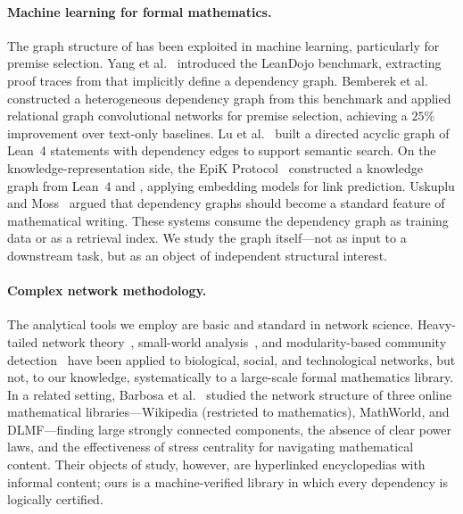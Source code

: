 \paragraph{Machine learning for formal mathematics.}
The graph structure of  has been exploited in machine learning, particularly for premise selection. Yang et al.~\cite{leandojo} introduced the LeanDojo benchmark, extracting proof traces from  that implicitly define a dependency graph. Bemberek et al.~\cite{bemberek2025} constructed a heterogeneous dependency graph from this benchmark and applied relational graph convolutional networks for premise selection, achieving a $25\%$ improvement over text-only baselines. Lu et al.~\cite{leanfinder} built a directed acyclic graph of Lean~4 statements with dependency edges to support semantic search. On the knowledge-representation side, the EpiK Protocol~\cite{epik2024} constructed a knowledge graph from Lean~4 and , applying embedding models for link prediction. Uskuplu and Moss~\cite{knowtex2025} argued that dependency graphs should become a standard feature of mathematical writing. These systems consume the dependency graph as training data or as a retrieval index. We study the graph itself---not as input to a downstream task, but as an object of independent structural interest.

\paragraph{Complex network methodology.}
The analytical tools we employ are basic and standard in network science. Heavy-tailed network theory~\cite{barabasi1999}, small-world analysis~\cite{watts1998}, and modularity-based community detection~\cite{newman2004,blondel2008} have been applied to biological, social, and technological networks, but not, to our knowledge, systematically to a large-scale formal mathematics library. In a related setting, Barbosa et al.~\cite{barbosa2013} studied the network structure of three online mathematical libraries---Wikipedia (restricted to mathematics), MathWorld, and DLMF---finding large strongly connected components, the absence of clear power laws, and the effectiveness of stress centrality for navigating mathematical content. Their objects of study, however, are hyperlinked encyclopedias with informal content; ours is a machine-verified library in which every dependency is logically certified.

